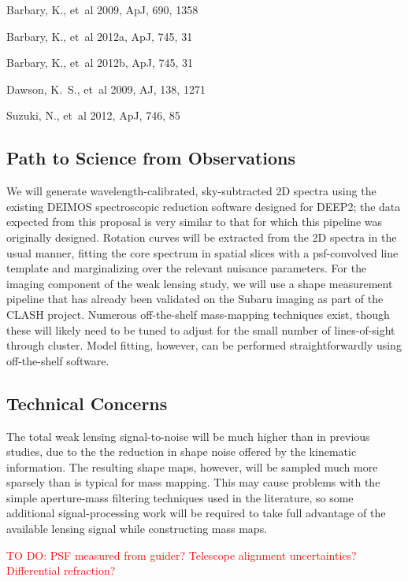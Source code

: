 \documentclass[12pt]{article}
\begin{document}
{\small
\begin{description}
  \item {Barbary}, K., {et~al} 2009, ApJ, 690, 1358
  \item {Barbary}, K., {et~al} 2012a, ApJ, 745, 31
  \item {Barbary}, K., {et~al} 2012b, ApJ, 745, 31
  \item {Dawson}, K.~S., {et~al} 2009, AJ,  138, 1271
  \item {Suzuki}, N., {et~al} 2012, ApJ, 746, 85
\end{description}
}

\subsection{Path to Science from Observations}
We will generate wavelength-calibrated, sky-subtracted 2D spectra using the existing DEIMOS spectroscopic reduction software designed for DEEP2; the data expected from this proposal is very similar to that for which this pipeline was originally designed. Rotation curves will be extracted from the 2D spectra in the usual manner, fitting the core spectrum in spatial slices with a psf-convolved line template and marginalizing over the relevant nuisance parameters. For the imaging component of the weak lensing study, we will use a shape measurement pipeline that has already been validated on the Subaru imaging as part of the CLASH project. Numerous off-the-shelf mass-mapping techniques exist, though these will likely need to be tuned to adjust for the small number of lines-of-sight through cluster. Model fitting, however, can be performed straightforwardly using off-the-shelf software.

\subsection{Technical Concerns}
The total weak lensing signal-to-noise will be much higher than in previous studies, due to the the reduction in shape noise offered by the kinematic information. The resulting shape maps, however, will be sampled much more sparsely than is typical for mass mapping. This may cause problems with the simple aperture-mass filtering techniques used in the literature, so some additional signal-processing work will be required to take full advantage of the available lensing signal while constructing mass maps.

\textcolor{Red}{TO DO: PSF measured from guider? Telescope alignment uncertainties? Differential refraction?}
\end{document}
